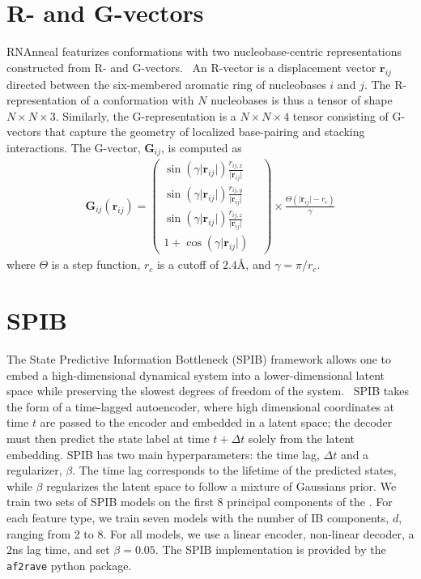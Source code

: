 \section{R- and G-vectors}
{}
\label{ch6:methods:rna-features}
RNAnneal featurizes conformations with two nucleobase-centric representations constructed from R- and G-vectors.~\cite{gvecs-bussi} An R-vector is a displacement vector $\mathbf{r}_{ij}$ directed between the six-membered aromatic ring of nucleobases $i$ and $j$. The R-representation of a conformation with $N$ nucleobases is thus a tensor of shape $N \times N \times 3$. Similarly, the G-representation is a $N \times N \times 4$
tensor consisting of G-vectors that capture the geometry of localized base-pairing and stacking interactions. The G-vector, $\mathbf{G}_{ij}$, is computed as
\begin{gather}
    \mathbf{G}_{ij}(\mathbf{r}_{ij}) =
    \begin{pmatrix}
    \sin (\gamma \lvert \mathbf{r}_{ij}\rvert)\frac{r_{ij,x}}{\lvert \mathbf{r}_{ij}\rvert} & \\
    \sin (\gamma \lvert \mathbf{r}_{ij}\rvert)\frac{r_{ij,y}}{\lvert \mathbf{r}_{ij}\rvert} & \\
    \sin (\gamma \lvert \mathbf{r}_{ij}\rvert)\frac{r_{ij,z}}{\lvert \mathbf{r}_{ij}\rvert} &  \\
    1 + \cos (\gamma \lvert \mathbf{r}_{ij}\rvert)
    \end{pmatrix}
    \times \frac{\Theta (\lvert \mathbf{r}_{ij}\rvert - r_c)}{\gamma}
\end{gather}
where $\Theta$ is a step function, $r_c$ is a cutoff of $2.4${\AA}, and $\gamma=\pi/r_c$.

\section{SPIB}
{}
\label{ch6:methods:spib}

The State Predictive Information Bottleneck (SPIB) framework allows one to embed a high-dimensional dynamical system into a lower-dimensional latent space while preserving the slowest degrees of freedom of the system.~\cite{wang2021state} SPIB takes the form of a time-lagged autoencoder, where high dimensional coordinates at time $t$ are passed to the encoder and embedded in a latent space; the decoder must then predict the state label at time $t+\Delta t$ solely from the latent embedding. SPIB has two main hyperparameters: the time lag, $\Delta t$ and a regularizer, $\beta$. The time lag corresponds to the lifetime of the predicted states, while $\beta$ regularizes the latent space to follow a mixture of Gaussians prior. We train two sets of SPIB models on the first 8 principal components of the . For each feature type, we train seven models with the number of IB components, $d$, ranging from 2 to 8. For all models, we use a linear encoder, non-linear decoder, a $2$ns lag time, and set $\beta=0.05$. The SPIB implementation is provided by the \texttt{af2rave} python package.~\cite{teng2025alphafold2}


